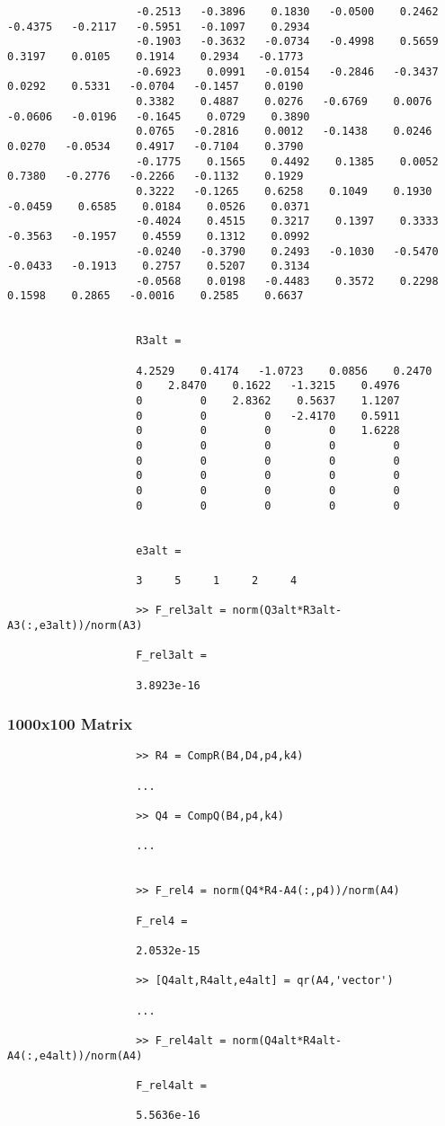 \documentclass[11pt,titlepage]{article}
\begin{document}
\begin{lstlisting}
					-0.2513   -0.3896    0.1830   -0.0500    0.2462   -0.4375   -0.2117   -0.5951   -0.1097    0.2934
					-0.1903   -0.3632   -0.0734   -0.4998    0.5659    0.3197    0.0105    0.1914    0.2934   -0.1773
					-0.6923    0.0991   -0.0154   -0.2846   -0.3437    0.0292    0.5331   -0.0704   -0.1457    0.0190
					0.3382    0.4887    0.0276   -0.6769    0.0076   -0.0606   -0.0196   -0.1645    0.0729    0.3890
					0.0765   -0.2816    0.0012   -0.1438    0.0246    0.0270   -0.0534    0.4917   -0.7104    0.3790
					-0.1775    0.1565    0.4492    0.1385    0.0052    0.7380   -0.2776   -0.2266   -0.1132    0.1929
					0.3222   -0.1265    0.6258    0.1049    0.1930   -0.0459    0.6585    0.0184    0.0526    0.0371
					-0.4024    0.4515    0.3217    0.1397    0.3333   -0.3563   -0.1957    0.4559    0.1312    0.0992
					-0.0240   -0.3790    0.2493   -0.1030   -0.5470   -0.0433   -0.1913    0.2757    0.5207    0.3134
					-0.0568    0.0198   -0.4483    0.3572    0.2298    0.1598    0.2865   -0.0016    0.2585    0.6637
					
					
					R3alt =
					
					4.2529    0.4174   -1.0723    0.0856    0.2470
					0    2.8470    0.1622   -1.3215    0.4976
					0         0    2.8362    0.5637    1.1207
					0         0         0   -2.4170    0.5911
					0         0         0         0    1.6228
					0         0         0         0         0
					0         0         0         0         0
					0         0         0         0         0
					0         0         0         0         0
					0         0         0         0         0
					
					
					e3alt =
					
					3     5     1     2     4
					
					>> F_rel3alt = norm(Q3alt*R3alt-A3(:,e3alt))/norm(A3)
					
					F_rel3alt =
					
					3.8923e-16
				\end{lstlisting}
			\subsubsection{1000x100 Matrix}
				\begin{lstlisting}
					>> R4 = CompR(B4,D4,p4,k4)
					
					...
					
					>> Q4 = CompQ(B4,p4,k4)
					
					...
					
					
					>> F_rel4 = norm(Q4*R4-A4(:,p4))/norm(A4)
					
					F_rel4 =
					
					2.0532e-15
					
					>> [Q4alt,R4alt,e4alt] = qr(A4,'vector')
					
					...
					
					>> F_rel4alt = norm(Q4alt*R4alt-A4(:,e4alt))/norm(A4)
					
					F_rel4alt =
					
					5.5636e-16
				\end{lstlisting}
			
\end{document}
